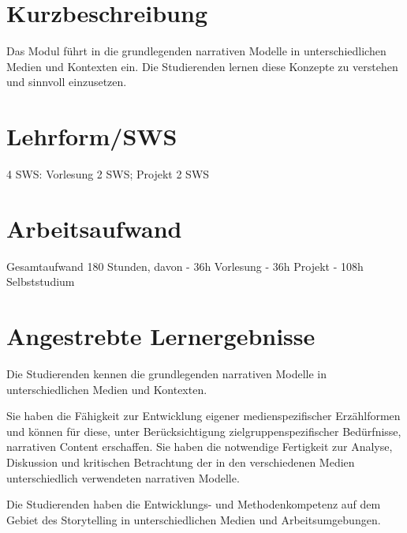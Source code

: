 \section*{Kurzbeschreibung\label{/mi-2017/modulbeschreibungen-master/MA_VC_Modul_Storytelling}}\label{kurzbeschreibungpathlabelmi-2017modulbeschreibungen-mastermaux5fvcux5fmodulux5fstorytelling}

Das Modul führt in die grundlegenden narrativen Modelle in
unterschiedlichen Medien und Kontexten ein. Die Studierenden lernen
diese Konzepte zu verstehen und sinnvoll einzusetzen.

\section*{Lehrform/SWS
\label{/mi-2017/modulbeschreibungen-master/MA_VC_Modul_Storytelling}}\label{lehrformsws-pathlabelmi-2017modulbeschreibungen-mastermaux5fvcux5fmodulux5fstorytelling}

4 SWS: Vorlesung 2 SWS; Projekt 2 SWS

\section*{Arbeitsaufwand
\label{/mi-2017/modulbeschreibungen-master/MA_VC_Modul_Storytelling}}\label{arbeitsaufwand-pathlabelmi-2017modulbeschreibungen-mastermaux5fvcux5fmodulux5fstorytelling}

Gesamtaufwand 180 Stunden, davon - 36h Vorlesung - 36h Projekt - 108h
Selbststudium

\section*{Angestrebte
Lernergebnisse\label{/mi-2017/modulbeschreibungen-master/MA_VC_Modul_Storytelling}}\label{angestrebte-lernergebnissepathlabelmi-2017modulbeschreibungen-mastermaux5fvcux5fmodulux5fstorytelling}

Die Studierenden kennen die grundlegenden narrativen Modelle in
unterschiedlichen Medien und Kontexten.

Sie haben die Fähigkeit zur Entwicklung eigener medienspezifischer
Erzählformen und können für diese, unter Berücksichtigung
zielgruppenspezifischer Bedürfnisse, narrativen Content erschaffen. Sie
haben die notwendige Fertigkeit zur Analyse, Diskussion und kritischen
Betrachtung der in den verschiedenen Medien unterschiedlich verwendeten
narrativen Modelle.

Die Studierenden haben die Entwicklungs- und Methodenkompetenz auf dem
Gebiet des Storytelling in unterschiedlichen Medien und
Arbeitsumgebungen.

